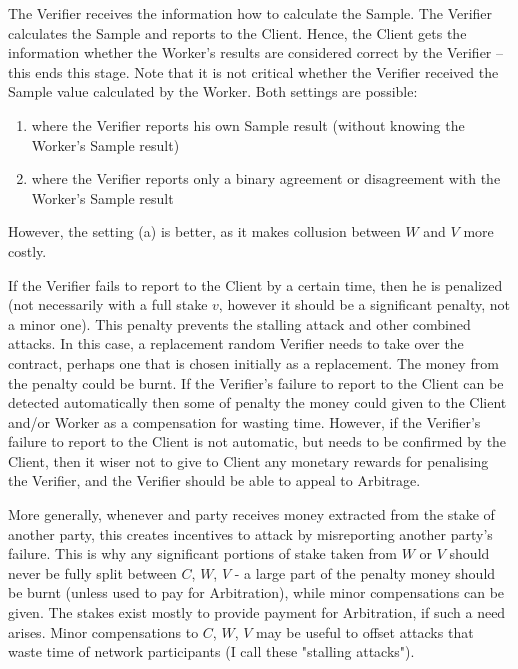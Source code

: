 \documentclass[conference]{IEEEtran}
\providecommand{\tightlist}{%
  \setlength{\itemsep}{0pt}%
  \setlength{\parskip}{0pt}%
  \setlength{\topsep}{0pt}}
\begin{document}
The Verifier receives the information how to calculate the Sample. The Verifier calculates the Sample and reports to the Client. Hence, the Client gets the information whether the Worker's results are considered correct by the Verifier – this ends this stage. Note that it is not critical whether the Verifier received the Sample value calculated by the Worker. Both settings are possible:
\renewcommand{\labelenumi}{(\alph{enumi})}
\begin{enumerate}[topsep=0pt]
    \tightlist
    \item where the Verifier reports his own Sample result (without knowing the Worker's Sample result)
    \item where the Verifier reports only a binary agreement or disagreement with the Worker's Sample result
\end{enumerate}
However, the setting (a) is better, as it makes collusion between $W$ and $V$ more costly.

If the Verifier fails to report to the Client by a certain time, then he is penalized (not necessarily with a full stake $v$, however it should be a significant penalty, not a minor one). This penalty prevents the stalling attack and other combined attacks. In this case, a replacement random Verifier needs to take over the contract, perhaps one that is chosen initially as a replacement. The money from the penalty could be burnt. If the Verifier's failure to report to the Client can be detected automatically then some of penalty the money could given to the Client and/or Worker  as a compensation for wasting time. However, if the Verifier's failure to report to the Client is not automatic, but needs to be confirmed by the Client, then it wiser not to give to Client any monetary rewards for penalising the Verifier, and the Verifier should be able to appeal to Arbitrage.

More generally, whenever and party receives money extracted from the stake of another party, this creates incentives to attack by misreporting another party's failure. This is why any significant portions of stake taken from $W$ or $V$ should never be fully split between $C$, $W$, $V$ - a large part of the penalty money should be burnt (unless used to pay for Arbitration), while minor compensations can be given. The stakes exist mostly to provide payment for Arbitration, if such a need arises. Minor compensations to $C$, $W$, $V$ may be useful to offset attacks that waste time of network participants (I call these "stalling attacks").
\end{document}
